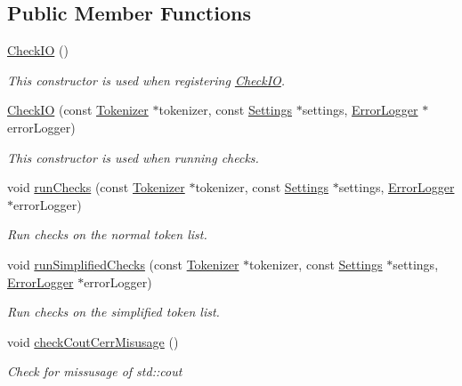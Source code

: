 \subsection*{Public Member Functions}
\begin{DoxyCompactItemize}
\item 
\hyperlink{class_check_i_o_afa9a2d421b8f148b8cb24355bdb5bac8}{Check\-I\-O} ()
\begin{DoxyCompactList}\small\item\em This constructor is used when registering \hyperlink{class_check_i_o}{Check\-I\-O}. \end{DoxyCompactList}\item 
\hyperlink{class_check_i_o_a4d9f192597bdcb7843b60dee2107f1a0}{Check\-I\-O} (const \hyperlink{class_tokenizer}{Tokenizer} $\ast$tokenizer, const \hyperlink{class_settings}{Settings} $\ast$settings, \hyperlink{class_error_logger}{Error\-Logger} $\ast$error\-Logger)
\begin{DoxyCompactList}\small\item\em This constructor is used when running checks. \end{DoxyCompactList}\item 
void \hyperlink{class_check_i_o_a91b83320d40c7e698174d1a92ba9b2c6}{run\-Checks} (const \hyperlink{class_tokenizer}{Tokenizer} $\ast$tokenizer, const \hyperlink{class_settings}{Settings} $\ast$settings, \hyperlink{class_error_logger}{Error\-Logger} $\ast$error\-Logger)
\begin{DoxyCompactList}\small\item\em Run checks on the normal token list. \end{DoxyCompactList}\item 
void \hyperlink{class_check_i_o_a22132ff11d70dd6d4c86323340c8dd46}{run\-Simplified\-Checks} (const \hyperlink{class_tokenizer}{Tokenizer} $\ast$tokenizer, const \hyperlink{class_settings}{Settings} $\ast$settings, \hyperlink{class_error_logger}{Error\-Logger} $\ast$error\-Logger)
\begin{DoxyCompactList}\small\item\em Run checks on the simplified token list. \end{DoxyCompactList}\item 
void \hyperlink{class_check_i_o_a5bf0d99d886be8cc8528379f1eeab0d4}{check\-Cout\-Cerr\-Misusage} ()
\begin{DoxyCompactList}\small\item\em Check for missusage of std\-::cout \end{DoxyCompactList}\item 

\end{DoxyCompactItemize}
